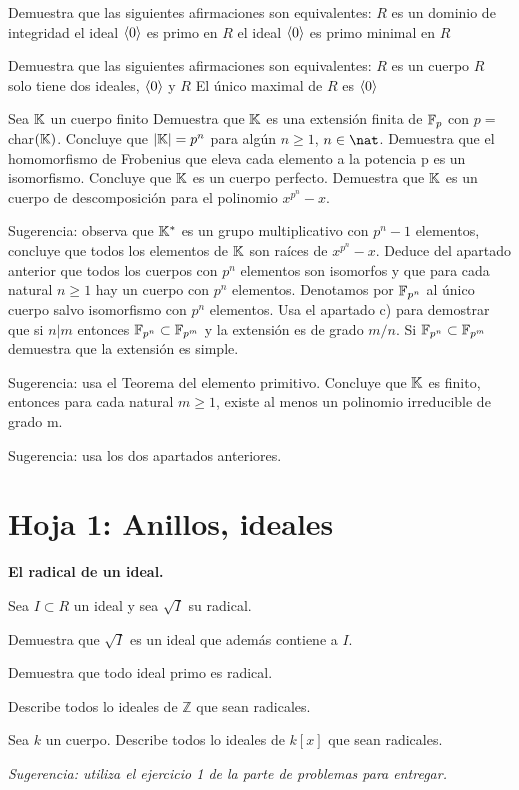 \begin{problem}
Demuestra que las siguientes afirmaciones son equivalentes:
\ppart $R$ es un dominio de integridad
\ppart el ideal $\mathopen{\langle} 0 \mathclose{\rangle}$ es primo en $R$
\ppart el ideal $\mathopen{\langle} 0 \mathclose{\rangle}$ es primo minimal en $R$
\solution
\end{problem}

\begin{problem}
Demuestra que las siguientes afirmaciones son equivalentes:
\ppart $R$ es un cuerpo
\ppart $R$ solo tiene dos ideales, $\mathopen{\langle} 0 \mathclose{\rangle}$ y $R$
\ppart El único maximal de $R$ es $\mathopen{\langle} 0 \mathclose{\rangle}$
\solution
\end{problem}

\begin{problem}
Sea $\mathbb{K}$ un cuerpo finito
\ppart Demuestra que $\mathbb{K}$ es una extensión finita de $\mathbb{F}_p$ con $p = $char$(\mathbb{K})$. Concluye que $|\mathbb{K}| = p^n$ para algún $n \geq 1$, $n \in \nat$.
\ppart Demuestra que el homomorfismo de Frobenius que eleva cada elemento a la potencia p es un isomorfismo. Concluye que $\mathbb{K}$ es un cuerpo perfecto.
\ppart Demuestra que $\mathbb{K}$ es un cuerpo de descomposición para el polinomio $x^{p^n}-x$.

Sugerencia: observa que $\mathbb{K}^*$ es un grupo multiplicativo con $p^n - 1$ elementos, concluye que todos los elementos de $\mathbb{K}$ son raíces de $x^{p^n}-x$.
\ppart Deduce del apartado anterior que todos los cuerpos con $p^n$ elementos son isomorfos y que para cada natural $n \geq 1$ hay un cuerpo con $p^n$ elementos. Denotamos por $\mathbb{F}_{p^n}$ al único cuerpo salvo isomorfismo con $p^n$ elementos.
\ppart Usa el apartado c) para demostrar que si $n|m$ entonces $\mathbb{F}_{p^n} \subset \mathbb{F}_{p^m}$ y la extensión es de grado $m/n$.
\ppart Si $\mathbb{F}_{p^n} \subset \mathbb{F}_{p^m}$ demuestra que la extensión es simple.

Sugerencia: usa el Teorema del elemento primitivo.
\ppart Concluye que $\mathbb{K}$ es finito, entonces para cada natural $m \geq 1$, existe al menos un polinomio irreducible de grado m.

Sugerencia: usa los dos apartados anteriores.
\solution
\end{problem}
\section{Hoja 1: Anillos, ideales}

\begin{problem}
{\bfseries El radical de un ideal.}

Sea $I\subset R$ un ideal  y sea $\sqrt{I}$ su radical.

\ppart Demuestra que $\sqrt{I}$ es un ideal que además contiene a $I$.

\ppart Demuestra que todo ideal primo es radical.

\ppart Describe todos lo ideales de ${\mathbb Z}$ que sean radicales.

\ppart Sea $k$ un cuerpo. Describe todos lo ideales de $k[x]$ que sean radicales.

{\em Sugerencia: utiliza el ejercicio 1  de la parte de problemas para entregar.}

\solution
\end{problem}

